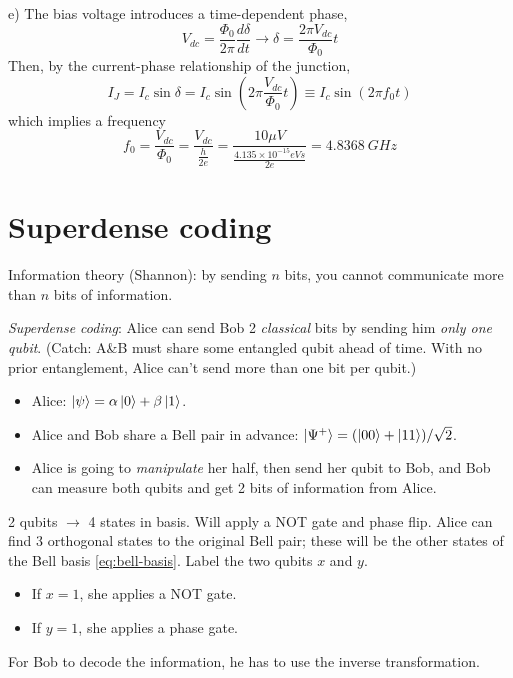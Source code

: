 \documentclass[12pt]{article}
\begin{document}
e) The bias voltage introduces a time-dependent phase,
\begin{equation}
    V_{dc} = \frac{\Phi_0}{2\pi} \frac{d\delta}{dt}  \rightarrow \delta = \frac{2\pi V_{dc}}{\Phi_0}t
\end{equation}
Then, by the current-phase relationship of the junction,
\begin{equation}
    I_J = I_c\sin\delta
    = I_c \sin\left(2\pi\frac{V_{dc}}{\Phi_0}t\right) \equiv I_c \sin(2\pi f_0 t)
\end{equation}
which implies a frequency
\begin{equation}
    f_0 = \frac{V_{dc}}{\Phi_0} = \frac{V_{dc}}{\frac{h}{2e}} = \frac{10 \mu V}{\frac{4.135 \times 10^{-15} eVs}{2e}} = \SI{4.8368}{GHz}
\end{equation}










\section{Superdense coding}
Information theory (Shannon): by sending $n$ bits, you cannot
communicate more than $n$ bits of information.

\emph{Superdense coding}: Alice can send Bob 2 \emph{classical} bits by sending
him \emph{only one qubit}. (Catch: A\&B must share some entangled qubit ahead
of time. With no prior entanglement, Alice can't send more than one bit per
qubit.)

\begin{itemize}
    \item Alice: $\ket{\psi} = \alpha\ket{0} + \beta\ket{1}$.
    \item Alice and Bob share a Bell pair in advance:
        $\ket{\Psi^+} = (\ket{00} + \ket{11})/\sqrt{2}$.
    \item  Alice is going to \emph{manipulate} her half, then send her qubit to
        Bob, and Bob can measure both qubits and get 2 bits of information from
        Alice.
\end{itemize}
2 qubits $\rightarrow$ 4 states in basis. Will apply a NOT gate and phase flip.
Alice can find 3 orthogonal states to the original Bell pair; these will be the
other states of the Bell basis \eqref{eq:bell-basis}. Label the two qubits $x$
and $y$.
\begin{itemize}
    \item If $x=1$, she applies a NOT gate.
    \item If $y=1$, she applies a phase gate.
\end{itemize}
For Bob to decode the information, he has to use the inverse transformation.
\end{document}
